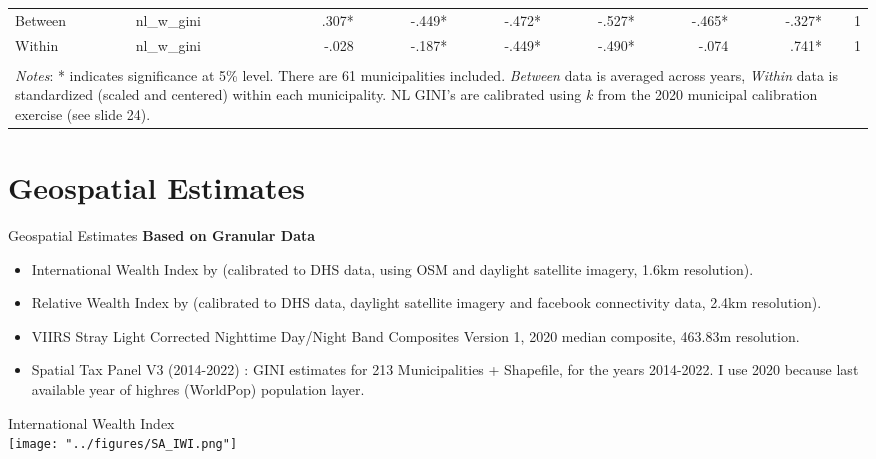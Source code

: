 \documentclass[compress,xcolor=dvipsnames]{beamer}
\newenvironment{noheadline}{
    \setbeamertemplate{headline}{}
    \addtobeamertemplate{frametitle}{\vspace*{-0.9\baselineskip}}{}
}{}
\begin{document}
\begin{frame}
\begin{table}[ht]
{\begin{tabular}{llrrrrrrr}
  Between & nl\_w\_gini &   .307* &  -.449* &  -.472* &  -.527* &  -.465* &  -.327* &    1    \\ 
  Within & nl\_w\_gini &  -.028  &  -.187* &  -.449* &  -.490* &  -.074  &   .741* &    1    \\   
   \bottomrule \\ [-1em]
   \multicolumn{9}{l}{\parbox{1.25\textwidth}{\footnotesize \textit{Notes}: * indicates significance at 5\% level. There are 61 municipalities included. \textit{Between} data is averaged across years, \textit{Within} data is standardized (scaled and centered) within each municipality. NL GINI's are calibrated using $k$ from the 2020 municipal calibration exercise (see slide 24). }}
\end{tabular}
}
\end{table}
\end{frame}

\section{Geospatial Estimates}

\begin{noheadline}
\begin{frame}{Geospatial Estimates}
\textbf{Based on Granular Data}
\begin{itemize}
\item International Wealth Index by \citet{lee2022high} (calibrated to DHS data, using OSM and daylight satellite imagery, 1.6km resolution).
\item Relative Wealth Index by \citet{chi2022microestimates} (calibrated to DHS data, daylight satellite imagery and facebook connectivity data, 2.4km resolution).
\item VIIRS Stray Light Corrected Nighttime Day/Night Band Composites Version 1, 2020 median composite, 463.83m resolution.
\item Spatial Tax Panel V3 (2014-2022) \citep{STP3}: GINI estimates for 213 Municipalities + Shapefile, for the years 2014-2022. I use 2020 because last available year of highres (WorldPop) population layer. 
\end{itemize}
\end{frame}
\end{noheadline}


\begin{frame}
International Wealth Index \\ %
\texttt{[image: "../figures/SA\_IWI.png"]}
\end{frame}
\end{document}
